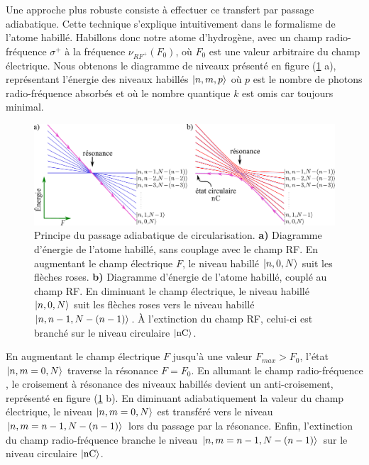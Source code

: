 Une approche plus robuste consiste à effectuer ce transfert par passage adiabatique.
Cette technique s'explique intuitivement dans le formalisme de l'atome habillé.
Habillons donc notre atome d'hydrogène, avec un champ radio-fréquence $\sigma^+$ à la fréquence $\nu_{RF^+}(F_0)$, où $F_0$ est une valeur arbitraire du champ électrique.
Nous obtenons le diagramme de niveaux présenté en figure (\ref{fig:passage_adiab_hydrogen} a), représentant l'énergie des niveaux habillés $\ket{n,m,p}$ où $p$ est le nombre de photons radio-fréquence absorbés et où le nombre quantique $k$ est omis car toujours minimal.
%
\begin{figure}[h]
\centering
\includegraphics[width=\linewidth]{figures/circulars/passage_adiab_hydrogen}
\caption[Principe du passage adiabatique de circularisation]{
Principe du passage adiabatique de circularisation.
\textbf{a)} Diagramme d'énergie de l'atome habillé, sans couplage avec le champ RF.
En augmentant le champ électrique $F$, le niveau habillé $\ket{n,0,N}$ suit les flèches roses.
\textbf{b)} Diagramme d'énergie de l'atome habillé, couplé au champ RF.
En diminuant le champ électrique, le niveau habillé $\ket{n,0,N}$ suit les flèches roses vers le niveau habillé $\ket{n,n-1,N-(n-1)}$. \`A l'extinction du champ RF, celui-ci est branché sur le niveau circulaire $\ket{\mathrm{nC}}$.
}
\label{fig:passage_adiab_hydrogen}
\end{figure} 
%
En augmentant le champ électrique $F$ jusqu'à une valeur $F_{max}>F_0$, l'état $\ket{n,m=0,N}$ traverse la résonance $F=F_0$.
En allumant le champ radio-fréquence%
, le croisement à résonance des niveaux habillés devient un anti-croisement, représenté en figure (\ref{fig:passage_adiab_hydrogen} b).
En diminuant adiabatiquement la valeur du champ électrique, le niveau $\ket{n,m=0,N}$ est transféré vers le niveau $\ket{n,m=n-1,N-(n-1)}$ lors du passage par la résonance.
Enfin, l'extinction du champ radio-fréquence branche le niveau $\ket{n,m=n-1,N-(n-1)}$ sur le niveau circulaire $\ket{\mathrm{nC}}$.


